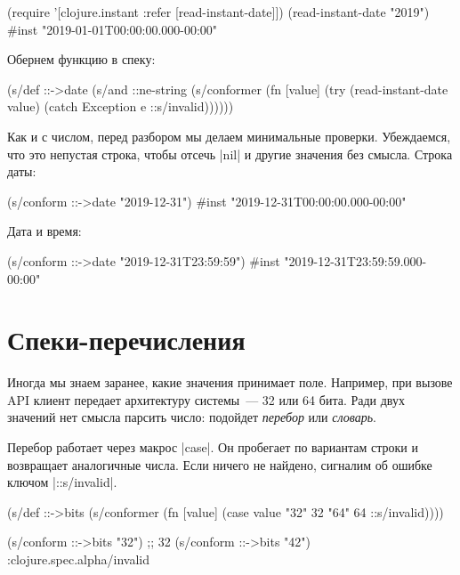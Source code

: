 \begin{english}
  \begin{clojure}
(require '[clojure.instant :refer [read-instant-date]])
(read-instant-date "2019")
#inst "2019-01-01T00:00:00.000-00:00"
  \end{clojure}
\end{english}

Обернем функцию в спеку:

\begin{english}
  \begin{clojure}
(s/def ::->date
  (s/and
   ::ne-string
   (s/conformer
    (fn [value]
      (try
        (read-instant-date value)
        (catch Exception e
          ::s/invalid))))))
  \end{clojure}
\end{english}

Как и с числом, перед разбором мы делаем минимальные проверки. Убеждаемся, что
это непустая строка, чтобы отсечь \spverb|nil| и другие значения без
смысла. Строка даты:

\begin{english}
  \begin{clojure}
(s/conform ::->date "2019-12-31")
#inst "2019-12-31T00:00:00.000-00:00"
  \end{clojure}
\end{english}

\noindent
Дата и время:

\begin{english}
  \begin{clojure}
(s/conform ::->date "2019-12-31T23:59:59")
#inst "2019-12-31T23:59:59.000-00:00"
  \end{clojure}
\end{english}

\section{Спеки-перечисления}

Иногда мы знаем заранее, какие значения принимает поле. Например, при вызове API
клиент передает архитектуру системы~--- 32 или 64 бита. Ради двух значений нет
смысла парсить число: подойдет \emph{перебор} или \emph{словарь}.

Перебор работает через макрос \spverb|case|. Он пробегает по вариантам строки и
возвращает аналогичные числа. Если ничего не найдено, сигналим об ошибке ключом
\spverb|::s/invalid|.

\begin{english}
  \begin{clojure}
(s/def ::->bits
  (s/conformer
   (fn [value]
     (case value
       "32" 32
       "64" 64
       ::s/invalid))))

(s/conform ::->bits "32") ;; 32
(s/conform ::->bits "42") :clojure.spec.alpha/invalid
  \end{clojure}
\end{english}


